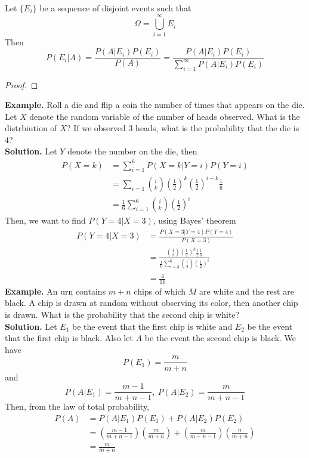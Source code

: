 \documentclass[openany]{report}
\begin{document}
\begin{theorem}
    Let $\{E_i\}$ be a sequence of disjoint events such that 
    \[\Omega = \bigcup_{i=1}^\infty E_i\]
    Then 
    \[P(E_i | A) = \frac{P(A|E_i)P(E_i)}{P(A)} = \frac{P(A | E_i)P(E_i)}{\sum_{i=1}^\infty P(A | E_i)P(E_i)}\]
\end{theorem}
\begin{proof}
    
\end{proof}
\textbf{Example.} Roll a die and flip a coin the number of times that appears on the die. Let $X$ denote the random variable of the number of heads observed. What is the distrbiution of $X$? If we observed 3 heads, what is the probability that the die is 4?\\[2ex]
\textbf{Solution.} Let $Y$ denote the number on the die, then 
\begin{align*}
    P(X = k) &= \sum_{i=1}^{6} P(X = k | Y = i)P(Y = i)\\
    &= \sum_{i=1}{i \choose k} \left(\frac{1}{2}\right)^k \left(\frac{1}{2}\right)^{i-k} \frac{1}{6}\\
    &= \frac{1}{6}\sum_{i=1}^6 {i \choose k} \left(\frac{1}{2}\right)^i
\end{align*}
Then, we want to find $P(Y = 4 | X = 3)$, using Bayes' theorem
\begin{align*}
    P(Y = 4 | X = 3) &= \frac{P(X=3|Y=4)P(Y=4)}{P(X=3)}\\
    &= \frac{{4 \choose 3}\left(\frac{1}{2}\right)^k\frac{1}{2}\frac{1}{6}}{\frac{1}{6}\sum_{i=3}^6{i \choose 3}\left(\frac{1}{2}\right)^i}\\
    &= \frac{4}{16}
\end{align*}
\textbf{Example.} An urn contains $m+n$ chips of which $M$ are white and the rest are black. A chip is drawn at random without observing its color, then another chip is drawn. What is the probability that the second chip is white?\\[2ex]
\textbf{Solution.}
Let $E_1$ be the event that the first chip is white and $E_2$ be the event that the first chip is black. Also let $A$ be the event the second chip is black. We have 
\[P(E_1) = \frac{m}{m+n}\]
and 
\[P(A|E_1) = \frac{m-1}{m+n-1}, \ P(A|E_2) = \frac{m}{m+n-1}\]
Then, from the law of total probability, 
\begin{align*}
    P(A) &= P(A|E_1)P(E_1)+ P(A|E_2)P(E_2)\\
    &= \left(\frac{m-1}{m+n-1}\right)\left(\frac{m}{m+n}\right) + \left(\frac{m}{m+n-1}\right)\left(\frac{n}{m+n}\right) \\
    &= \frac{m}{m+n}
\end{align*}
\end{document}
